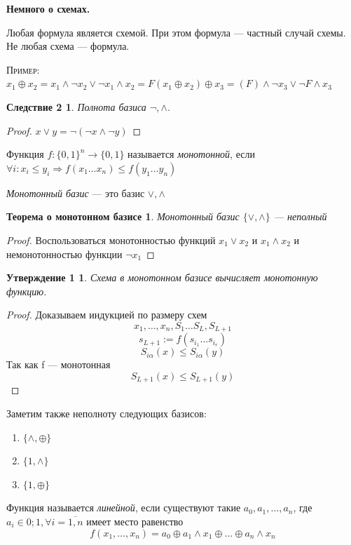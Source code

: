 \documentclass[a4paper, 12pt]{article}
\newtheorem*{sl2}{Следствие 2}
\newtheorem*{monotonousbase}{Теорема о монотонном базисе}
\newtheorem*{scheme}{Утверждение 1}
\begin{document}
\textbf{Немного о схемах.}

Любая формула является схемой. При этом формула --- частный случай схемы. Не любая схема --- формула.

\textsc{Пример: }
$x_1 \oplus x_2 = x_1 \wedge \lnot x_2 \vee \lnot x_1 \wedge x_2 = F
(x_1 \oplus x_2) \oplus x_3 = (F)  \wedge \lnot x_3 \vee \lnot F \wedge x_3$

\begin{sl2}
Полнота базиса {$\lnot, \wedge$}.
\end{sl2}
\begin{proof}
$x \vee y = \lnot (\lnot x \wedge \lnot y)$
\end{proof}
Функция $f:\{0, 1\}^n \rightarrow \{0, 1\}$ называется \textit{монотонной}, если $\forall i: x_i \leqslant y_i \Rightarrow f(x_1 \ldots x_n) \leqslant f(y_1 \ldots y_n)$

\textit{Монотонный базис} --- это базис {$\vee, \wedge$}

\begin{monotonousbase}
Монотонный базис $\{\vee, \wedge\}$ --- неполный
\end{monotonousbase}
\begin{proof}
Воспользоваться монотонностью функций $x_1 \vee x_2$ и $x_1 \wedge x_2$ и немонотонностью функции $\lnot x_1$
\end{proof}
\begin{scheme}
Схема в монотонном базисе вычисляет монотонную функцию.
\end{scheme}
\begin{proof}
Доказываем индукцией по размеру схем
\[x_1, \ldots, x_n, S_1 \ldots S_L, S_{L+1}\] 
\[s_{L+1}:=f(s_{i_1}... s_{i_r})\]
\[S_{i\alpha}(x) \leqslant S_{i\alpha}(y)\]
Так как f --- монотонная
\[S_{L+1}(x) \leqslant S_{L+1}(y)\]
\end{proof}

Заметим также неполноту следующих базисов:
\begin{enumerate}
    \item $\{\wedge,\oplus\}$
    \item $\{1,\wedge\}$
    \item $\{1,\oplus\}$
\end{enumerate}

Функция называется \textit{линейной}, если существуют такие $a_0, a_1, \ldots ,a_n$, где $a_i \in {0;1}, \forall i = \overline{1,n}$ имеет место равенство 
\[f(x_1, \ldots ,x_n) = a_0 \oplus a_1 \wedge x_1 \oplus \ldots \oplus a_n \wedge x_n\]
\end{document}

